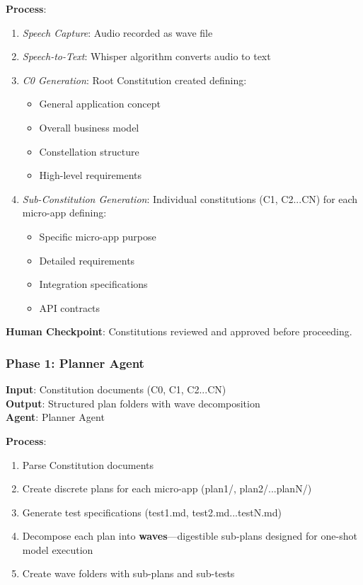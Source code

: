 \documentclass[12pt,letterpaper]{article}
\begin{document}
\textbf{Process}:
\begin{enumerate}
    \item \textit{Speech Capture}: Audio recorded as wave file
    \item \textit{Speech-to-Text}: Whisper algorithm converts audio to text
    \item \textit{C0 Generation}: Root Constitution created defining:
    \begin{itemize}
        \item General application concept
        \item Overall business model
        \item Constellation structure
        \item High-level requirements
    \end{itemize}
    \item \textit{Sub-Constitution Generation}: Individual constitutions (C1, C2...CN) for each micro-app defining:
    \begin{itemize}
        \item Specific micro-app purpose
        \item Detailed requirements
        \item Integration specifications
        \item API contracts
    \end{itemize}
\end{enumerate}

\textbf{Human Checkpoint}: Constitutions reviewed and approved before proceeding.

\subsubsection{Phase 1: Planner Agent}

\textbf{Input}: Constitution documents (C0, C1, C2...CN)\\
\textbf{Output}: Structured plan folders with wave decomposition\\
\textbf{Agent}: Planner Agent

\textbf{Process}:
\begin{enumerate}
    \item Parse Constitution documents
    \item Create discrete plans for each micro-app (plan1/, plan2/...planN/)
    \item Generate test specifications (test1.md, test2.md...testN.md)
    \item Decompose each plan into \textbf{waves}—digestible sub-plans designed for one-shot model execution
    \item Create wave folders with sub-plans and sub-tests
\end{enumerate}
\end{document}
